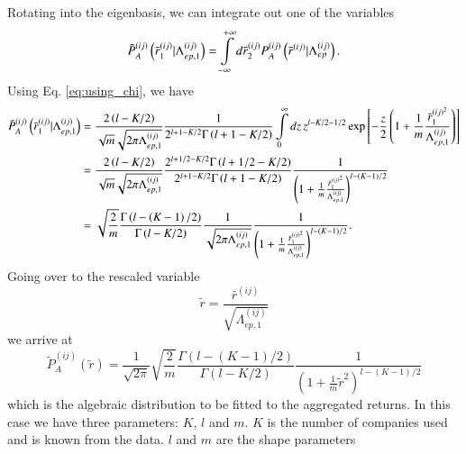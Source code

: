 Rotating into the eigenbasis, we can integrate out one of the variables
\begin{equation}
    \tilde{P}_{A}^{\left(ij\right)}\left(\bar{r}_{1}^{\left(ij\right)}|
    \Lambda_{ep,1}^{\left(ij\right)}\right)
    =\intop_{-\infty}^{+\infty}d\bar{r}_{2}^{\left(ij\right)}
    P_{A}^{\left(ij\right)}\left(\bar{r}^{\left(ij\right)}|
    \Lambda_{ep}^{\left(ij\right)}\right).
\end{equation}
Using Eq. \ref{eq:using_chi}, we have
\begin{align}
    \tilde{P}_{A}^{\left(ij\right)}\left(\bar{r}_{1}^{\left(ij\right)}|
    \Lambda_{ep,1}^{\left(ij\right)}\right)
    &=\frac{2\left(l-K/2\right)}{\sqrt{m}\sqrt{2\pi\Lambda_{ep,1}
    ^{\left(ij\right)}}}\frac{1}{2^{l+1-K/2}\Gamma\left(l+1-K/2\right)}
    \intop_{0}^{\infty}dz\,z^{l-K/2-1/2}\exp\left[-\frac{z}{2}
    \left(1+\frac{1}{m}\frac{\bar{r}_{1}^{\left(ij\right)^{2}}}
    {\Lambda_{ep,1}^{\left(ij\right)}}\right)\right]\\
    &=\frac{2\left(l-K/2\right)}{\sqrt{m}\sqrt{2\pi\Lambda_{ep,1}^
    {\left(ij\right)}}}\frac{2^{l+1/2-K/2}
    \Gamma\left(l+1/2-K/2\right)}{2^{l+1-K/2}
    \Gamma\left(l+1-K/2\right)}\frac{1}{\left(1+\frac{1}{m}
    \frac{\bar{r}_{1}^{\left(ij\right)^{2}}}
    {\Lambda_{ep,1}^{\left(ij\right)}}\right)^{l-\left(K-1\right)/2}}\\
    &=\sqrt{\frac{2}{m}}\frac{\Gamma\left(l-\left(K-1\right)/2\right)}
    {\Gamma\left(l-K/2\right)}\frac{1}{\sqrt{2\pi\Lambda_{ep,1}
    ^{\left(ij\right)}}}\frac{1}{\left(1+\frac{1}{m}
    \frac{\bar{r}_{1}^{\left(ij\right)^{2}}}
    {\Lambda_{ep,1}^{\left(ij\right)}}\right)^{l-\left(K-1\right)/2}}.
\end{align}
Going over to the rescaled variable
\begin{equation}
    \tilde{r} = \frac{\bar{r}^{\left( ij \right)}}{\sqrt{\Lambda_{ep,1}
    ^{\left( ij \right)}}}
\end{equation}
we arrive at
\begin{equation}
    \tilde{P}_{A}^{\left(ij\right)}\left(\tilde{r}\right)
    =\frac{1}{\sqrt{2\pi}}\sqrt{\frac{2}{m}}
    \frac{\Gamma\left(l-\left(K-1\right)/2\right)}{\Gamma\left(l-K/2\right)}
    \frac{1}{\left(1+\frac{1}{m}\tilde{r}^{2}\right)^{l-\left(K-1\right)/2}}
\end{equation}
which is the algebraic distribution to be fitted to the aggregated returns.
In this case we have three parameters: $K$, $l$ and $m$. $K$ is the number of
companies used and is known from the data. $l$ and $m$ are the shape parameters
